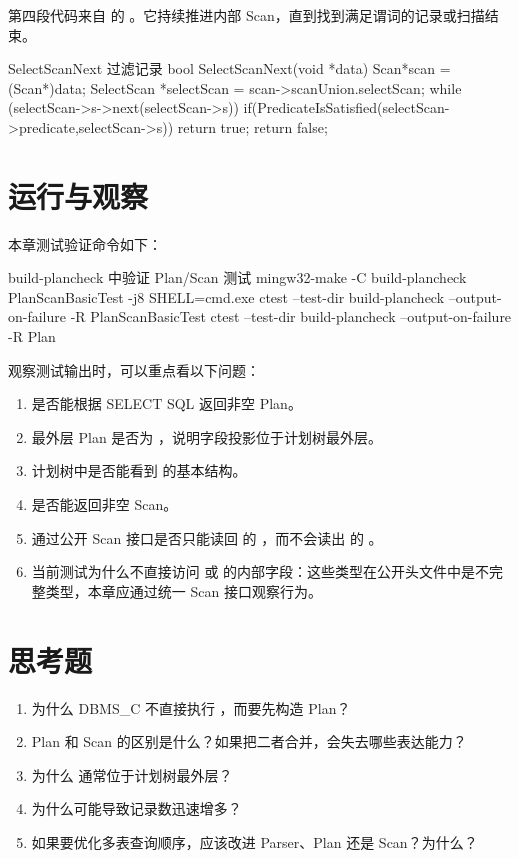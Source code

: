第四段代码来自  的 。它持续推进内部 Scan，直到找到满足谓词的记录或扫描结束。

\begin{dbcode}{SelectScanNext 过滤记录}
bool SelectScanNext(void *data){
    Scan*scan = (Scan*)data;
    SelectScan *selectScan = scan->scanUnion.selectScan;
    while (selectScan->s->next(selectScan->s)){
        if(PredicateIsSatisfied(selectScan->predicate,selectScan->s)){
            return true;
        }
    }
    return false;
}
\end{dbcode}

\section{运行与观察}
\label{sec:plan-scan-run}

本章测试验证命令如下：

\begin{dbcode}[listing options={language=bash}]{build-plancheck 中验证 Plan/Scan 测试}
mingw32-make -C build-plancheck PlanScanBasicTest -j8 SHELL=cmd.exe
ctest --test-dir build-plancheck --output-on-failure -R PlanScanBasicTest
ctest --test-dir build-plancheck --output-on-failure -R Plan
\end{dbcode}

观察测试输出时，可以重点看以下问题：

\begin{enumerate}
  \item {} 是否能根据 SELECT SQL 返回非空 Plan。
  \item 最外层 Plan 是否为 ，说明字段投影位于计划树最外层。
  \item 计划树中是否能看到  的基本结构。
  \item {} 是否能返回非空 Scan。
  \item 通过公开 Scan 接口是否只能读回  的 ，而不会读出  的 。
  \item 当前测试为什么不直接访问  或  的内部字段：这些类型在公开头文件中是不完整类型，本章应通过统一 Scan 接口观察行为。
\end{enumerate}

\section{思考题}
\label{sec:plan-scan-questions}

\begin{enumerate}
  \item 为什么 DBMS\_C 不直接执行 ，而要先构造 Plan？
  \item Plan 和 Scan 的区别是什么？如果把二者合并，会失去哪些表达能力？
  \item 为什么  通常位于计划树最外层？
  \item {} 为什么可能导致记录数迅速增多？
  \item 如果要优化多表查询顺序，应该改进 Parser、Plan 还是 Scan？为什么？
\end{enumerate}
